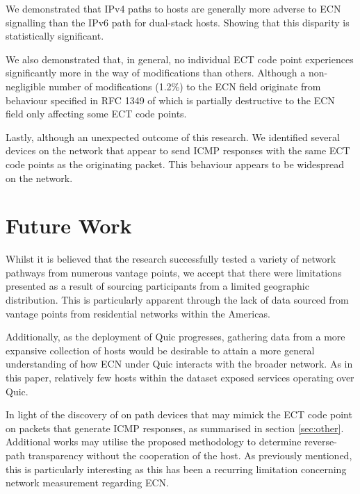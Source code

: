 \documentclass{l4proj}
\begin{document}
We demonstrated that IPv4 paths to hosts are generally more adverse to ECN signalling than the IPv6 path for dual-stack hosts. Showing that this disparity is statistically significant.

We also demonstrated that, in general, no individual ECT code point experiences significantly more in the way of modifications than others. Although a non-negligible number of modifications (1.2\%) to the ECN field originate from behaviour specified in RFC 1349\cite{rfc1349} of which is partially destructive to the ECN field only affecting some ECT code points.

Lastly, although an unexpected outcome of this research. We identified several devices on the network that appear to send ICMP responses with the same ECT code points as the originating packet. This behaviour appears to be widespread on the network.



\section{Future Work}

Whilst it is believed that the research successfully tested a variety of network pathways from numerous vantage points, we accept that there were limitations presented as a result of sourcing participants from a limited geographic distribution. This is particularly apparent through the lack of data sourced from vantage points from residential networks within the Americas.

Additionally, as the deployment of Quic progresses, gathering data from a more expansive collection of hosts would be desirable to attain a more general understanding of how ECN under Quic interacts with the broader network. As in this paper, relatively few hosts within the dataset exposed services operating over Quic.

In light of the discovery of on path devices that may mimick the ECT code point on packets that generate ICMP responses, as summarised in section \ref{sec:other}. Additional works may utilise the proposed methodology to determine reverse-path transparency without the cooperation of the host. As previously mentioned, this is particularly interesting as this has been a recurring limitation concerning network measurement regarding ECN.


%
% 
\end{document}
